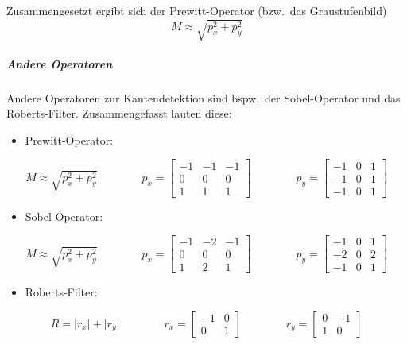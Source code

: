 \documentclass[a4paper, 11pt, accentcolor = tud3b]{tudreport}
\newcommand{\bzw}{bzw.~}
\newcommand{\bspw}{bspw.~}
\begin{document}
							Zusammengesetzt ergibt sich der Prewitt-Operator (\bzw das Graustufenbild)
							\begin{equation*}
								M \approx \sqrt{p_x^2 + p_y^2}
							\end{equation*}

						\subparagraph{Andere Operatoren} %
							Andere Operatoren zur Kantendetektion sind \bspw der Sobel-Operator und das Roberts-Filter. Zusammengefasst lauten diese:
							\begin{itemize}
								\item Prewitt-Operator:
							\end{itemize}
							\begin{equation*}
								M \approx \sqrt{p_x^2 + p_y^2} \quad\quad\quad\quad
								p_x = \begin{bmatrix}
									-1 & -1 & -1 \\
									0  & 0  & 0  \\
									1  & 1  & 1
								\end{bmatrix} \quad\quad\quad\quad
								p_y = \begin{bmatrix}
									-1 & 0 & 1 \\
									-1 & 0 & 1 \\
									-1 & 0 & 1
								\end{bmatrix}
							\end{equation*}
							\begin{itemize}
								\item Sobel-Operator:
							\end{itemize}
							\begin{equation*}
								M \approx \sqrt{p_x^2 + p_y^2} \quad\quad\quad\quad
								p_x = \begin{bmatrix}
									-1 & -2 & -1 \\
									0  & 0  & 0  \\
									1  & 2  & 1
								\end{bmatrix} \quad\quad\quad\quad
								p_y = \begin{bmatrix}
									-1 & 0 & 1 \\
									-2 & 0 & 2 \\
									-1 & 0 & 1
								\end{bmatrix}
							\end{equation*}
							\begin{itemize}
								\item Roberts-Filter:
							\end{itemize}
							\begin{equation*}
								R = \lvert r_x \rvert + \lvert r_y \rvert \quad\quad\quad\quad
								r_x = \begin{bmatrix}
									-1 & 0 \\
									0  & 1
								\end{bmatrix} \quad\quad\quad\quad
								r_y = \begin{bmatrix}
									0 & -1 \\
									1 & 0
								\end{bmatrix}
							\end{equation*}
\end{document}
